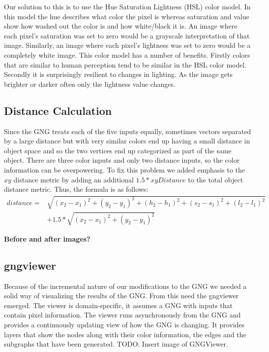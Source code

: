 \documentclass{article}
\renewcommand{\|}{\origbar} %
\begin{document}
Our solution to this is to use the Hue Saturation Lightness (HSL) color model. In this model the hue describes what color the pixel is whereas saturation and value show how washed out the color is and how white/black it is. An image where each pixel's saturation was set to zero would be a grayscale interpretation of that image. Similarly, an image where each pixel's lightness was set to zero would be a completely white image. This color model has a number of benefits. Firstly colors that are similar to human perception tend to be similar in the HSL color model. Secondly it is surprisingly resilient to changes in lighting. As the image gets brighter or darker often only the lightness value changes.


\subsection{Distance Calculation}


Since the GNG treats each of the five inputs equally, sometimes vectors separated by a large distance but with very similar colors end up having a small distance in object space and so the two vertices end up categorized as part of the same object. There are three color inputs and only two distance inputs, so the color information can be overpowering. To fix this problem we added emphasis to the $xy$ distance metric by adding an additional $1.5 * xyDistance$ to the total object distance metric. Thus, the formula is as follows:
\begin{align*}
  distance = &\sqrt{(x_2-x_1)^2+(y_2-y_1)^2+(h_2-h_1)^2+(s_2-s_1)^2+(l_2-l_1)^2} \\ &+ 1.5*\sqrt{(x_2-x_1)^2+(y_2-y_1)^2}
\end{align*}

{\bf Before and after images?}

\subsection{gngviewer}

Because of the incremental nature of our modifications to the GNG we needed a solid way of visualizing the results of the GNG. From this need the gngviewer emerged. The viewer is domain-specific, it assumes a GNG with inputs that contain pixel information. The viewer runs asynchronously from the GNG and provides a continuously updating view of how the GNG is changing. It provides layers that show the nodes along with their color information, the edges and the subgraphs that have been generated. TODO: Insert image of GNGViewer.
\end{document}
